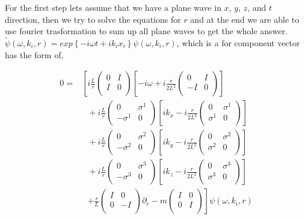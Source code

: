 For the first step lets assume that we have a plane wave in $x$, $y$, $z$, and $t$ direction, then we try to solve the equations for $r$ and at the end we are able to use fourier trasformation to sum up all plane waves to get the whole answer. $\tilde{\psi}(\omega,k_i,r) = exp\left\{-i\omega t + ik_i x_i\right\}\psi(\omega,k_i,r)$, which is a for component vector has the form of,

\begin{align}
   0 =& \left[ i\frac{L}{r} \begin{pmatrix} 0 & I \\ I & 0 \\ \end{pmatrix} \left[-i\omega + i\frac{r}{2L^2}\begin{pmatrix} 0 & I \\ -I & 0 \\ \end{pmatrix} \right] \right.\nonumber\\
      & ~~~ + i\frac{L}{r}\begin{pmatrix} 0 & \sigma^1 \\ -\sigma^1 & 0 \\ \end{pmatrix} \left[ik_x - i\frac{r}{2L^2}\begin{pmatrix} 0 & \sigma^1 \\ \sigma^1 & 0 \\ \end{pmatrix} \right] \nonumber\\
      & ~~~ + i\frac{L}{r}\begin{pmatrix} 0 & \sigma^2 \\ -\sigma^2 & 0 \\ \end{pmatrix} \left[ik_y - i\frac{r}{2L^2}\begin{pmatrix} 0 & \sigma^2 \\ \sigma^2 & 0 \\ \end{pmatrix} \right] \nonumber\\
      & ~~~ + i\frac{L}{r}\begin{pmatrix} 0 & \sigma^3 \\ -\sigma^3 & 0 \\ \end{pmatrix} \left[ik_z - i\frac{r}{2L^2}\begin{pmatrix} 0 & \sigma^3 \\ \sigma^3 & 0 \\ \end{pmatrix} \right] \nonumber\\
      & ~~~ \left. + \frac{r}{L}\begin{pmatrix} I & 0 \\ 0 & -I \\ \end{pmatrix} \partial_r - m \begin{pmatrix} I & 0 \\ 0 & I \\ \end{pmatrix} \right] \psi(\omega,k_i,r)
\end{align}

